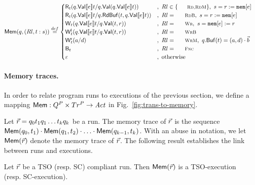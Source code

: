\begin{figure*}[th]
\[
\alimemtracex {q,(Rl,t:s)} \stackrel{def}{=} 
 \begin{cases}
  \alireadx t {q.\alivaluation{\alievalx e}t} {q.\alivaluationx {q.\alivaluation{\alievalx e}t}} & ,\ Rl\in\{\textnormal{\sc\small Rd,RdM}\},\ s=r:=\alimemx e\\
  \alireadx t {q.\alivaluation{\alievalx e}t} {q.\alireadbufferx t {q.\alivaluation{\alievalx e}t}} &,\ Rl=\textnormal{\sc\small RdB},\ s=r:=\alimemx e\\
  \aliwritex t {q.\alivaluation{\alievalx e}t} {q.\alivaluationx {t,r}} &,\ Rl=\textnormal{\sc\small Wr},\ s=\alimemx e:= r\\
  \locwritex t {q.\alivaluation{\alievalx e}t} {q.\alivaluationx {t,r}} &,\ Rl=\textnormal{\sc\small WrB}\\
  \remwritex t a d &,\ Rl=\textnormal{\sc\small WrM},\ q.\alibufferx t=(a,d)\cdot \alisequencex b\\
  \alibarrierx t &,\ Rl=\textnormal{\sc \small Fnc}\\
  \varepsilon &,\ \textnormal{otherwise}
 \end{cases}
\]
\caption{Mapping transitions to memory operations.}
\label{fig:trans-to-memory}
\end{figure*}


\paragraph{Memory traces.}
In order to relate program runs to executions of the previous section, we define a mapping $\mathsf{Mem}:Q^{P}\times Tr^{P} \rightarrow \mathit{Act}$ in Fig.~\ref{fig:trans-to-memory}.

Let $\vec{r}=q_0t_1q_1\ldots t_kq_k$ be a run.
The memory trace of $\vec{r}$ is the sequence $\mathsf{Mem}(q_0,t_1)\cdot \mathsf{Mem}(q_1,t_2) \cdot \ldots \cdot \mathsf{Mem}(q_{k-1},t_k)$.
With an abuse in notation, we let $\mathsf{Mem}(\vec{r})$ denote the memory trace of $\vec{r}$.
The following result establishes the link between runs and executions.

\begin{proposition}
Let $\vec{r}$ be a TSO (resp. SC) compliant run.
Then $\mathsf{Mem}(\vec{r})$ is a TSO-execution (resp. SC-execution).
\end{proposition}
